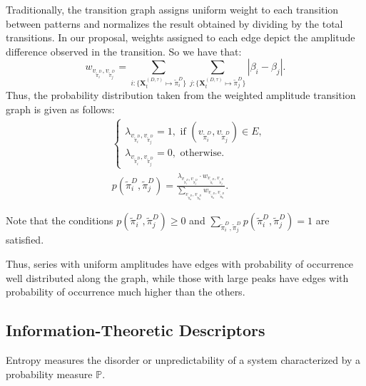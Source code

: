 \documentclass[journal]{IEEEtran}
\begin{document}
Traditionally, the transition graph assigns uniform weight to each transition between patterns and normalizes the result obtained by dividing by the total transitions.
In our proposal, %
 weights assigned to each edge depict the amplitude difference observed in the transition.
So we have that:	
\begin{equation}
w_{v_{\widetilde \pi^D_i}, v_{\widetilde \pi^D_j}} =  \sum_{i : \{\mathbf{X}^{(D,\tau)}_t \mapsto \widetilde\pi^D_i\}} \sum_{j : \{\mathbf{X}^{(D,\tau)}_t \mapsto \widetilde\pi^D_j\}} |\beta_i - \beta_j| .
\end{equation}
Thus, the probability distribution taken from the weighted amplitude transition graph is given as follows:	
\begin{align}
&\left\{\begin{array}{l}
\lambda_{v_{\widetilde\pi^D_i}, v_{\widetilde\pi^D_j}} = 1, \text{ if } (v_{\widetilde\pi^D_i}, v_{\widetilde\pi^D_j}) \in {E}, \\
\lambda_{v_{\widetilde\pi^D_i}, v_{\widetilde\pi^D_j}} = 0, \text{ otherwise}.
\end{array}\right. \\
%
&p(\widetilde\pi^D_i, \widetilde\pi^D_j) = \frac{\lambda_{v_{\widetilde\pi^D_i}, v_{\widetilde\pi^D_j}} \cdot w_{v_{\widetilde\pi^D_i}, v_{\widetilde\pi^D_j}}}{\sum_{v_{\widetilde\pi^D_a}, v_{\widetilde\pi^D_b}} w_{v_{\widetilde\pi^D_a}, v_{\widetilde\pi^D_b}}}.
\end{align}

Note that the conditions $p(\widetilde\pi^D_i, \widetilde\pi^D_j) \ge 0$ and $\sum_{\widetilde\pi^D_i, \widetilde\pi^D_j} p(\widetilde\pi^D_i, \widetilde\pi^D_j) = 1$ are satisfied.

Thus, series with uniform amplitudes have edges with probability of occurrence well distributed along the graph, while those with large peaks have edges with probability of occurrence much higher than the others.

\subsection{Information-Theoretic Descriptors}\label{HC}

Entropy measures the disorder or unpredictability of a system characterized by a probability measure $\mathbb{P}$.
\end{document}
